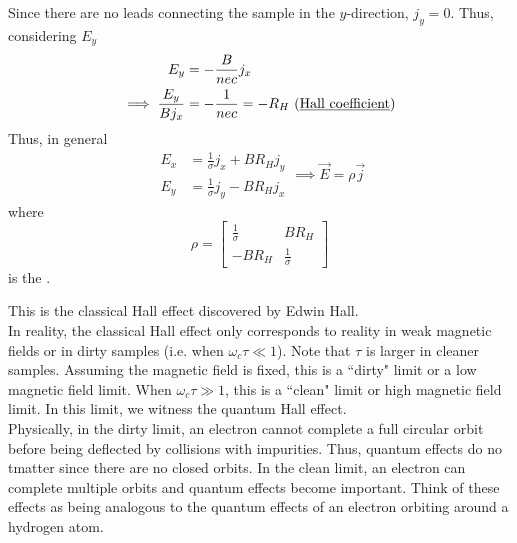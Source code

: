 \documentclass[12pt,a4paper,titlepage]{article}
\newcommand{\trm}[1]{\textrm{#1}} %
\newcommand{\ul}[1]{\underline{\smash{#1}}} %
\begin{document}
Since there are no leads connecting the sample in the $y$-direction, $j_{y}=0$. Thus, considering $E_{y}$
\begin{equation}
\begin{aligned}
E_{y}&=-\frac{B}{nec}j_{x}\\
\implies \frac{E_{y}}{Bj_{x}}&=-\frac{1}{nec}=-R_{H} \trm{ (\ul{Hall coefficient})}
\end{aligned}
\end{equation}
Thus, in general
\begin{equation}
\begin{aligned}
E_{x}&=\frac{1}{\sigma}j_{x}+BR_{H}j_{y}\\
E_{y}&=\frac{1}{\sigma}j_{y}-BR_{H}j_{x}
\end{aligned}
\implies \vec{E}=\rho\vec{j}
\end{equation}
where 
\begin{equation}
\rho=\begin{bmatrix}
\frac{1}{\sigma} & BR_{H}\\
-BR_{H} & \frac{1}{\sigma}
\end{bmatrix}
\end{equation}
is the \ul{resistivity tensor}.
\begin{center}
\end{center}
This is the classical Hall effect discovered by Edwin Hall.\\

In reality, the classical Hall effect only corresponds to reality in weak magnetic fields or in dirty samples (i.e. when $\omega_{c}\tau\ll 1$). Note that $\tau$ is larger in cleaner samples. Assuming the magnetic field is fixed, this is a ``dirty" limit or a low magnetic field limit. When $\omega_{c}\tau\gg 1$, this is a ``clean" limit or high magnetic field limit. In this limit, we witness the quantum Hall effect.\\

Physically, in the dirty limit, an electron cannot complete a full circular orbit before being deflected by collisions with impurities. Thus, quantum effects do no tmatter since there are no closed orbits. In the clean limit, an electron can complete multiple orbits and quantum effects become important. Think of these effects as being analogous to the quantum effects of an electron orbiting around a hydrogen atom.
\begin{center}
\end{center}
\end{document}
